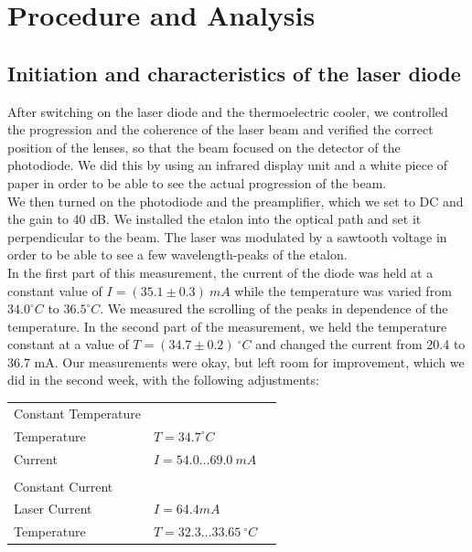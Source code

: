 \section{Procedure and Analysis}

\subsection{Initiation and characteristics of the laser diode}

After switching on the laser diode and the thermoelectric cooler, we controlled the progression and the coherence of the laser beam and verified the correct position of the lenses, so that the beam focused on the detector of the photodiode. We did this by using an infrared display unit and a white piece of paper in order to be able to see the actual progression of the beam.\\

We then turned on the photodiode and the preamplifier, which we set to DC and the gain to 40 dB. We installed the etalon into the optical path and set it perpendicular to the beam. The laser was modulated by a sawtooth voltage in order to be able to see a few wavelength-peaks of the etalon.\\

In the first part of this measurement, the current of the diode was held at a constant value of $I = (35.1\pm 0.3)\ mA$ while the temperature was varied from $34.0^\circ C$ to $36.5^\circ C$. We measured the scrolling of the peaks in dependence of the temperature.
In the second part of the measurement, we held the temperature constant at a value of $T=(34.7 \pm 0.2)\ ^\circ C$ and changed the current from 20.4 to 36.7 mA.
Our measurements were okay, but left room for improvement, which we did in the second week, with the following adjustments:\\

\begin{center}
\begin{tabular}[H]{l l c}
Constant Temperature & \\
Temperature & $T=34.7 ^\circ C$\\
Current & $I = 54.0 \dots 69.0\ mA$\\
 & \\
Constant Current & \\
Laser Current & $I = 64.4 mA$\\
Temperature & $T=32.3 \dots 33.65\ ^\circ C$\\
\end{tabular}
\end{center}

